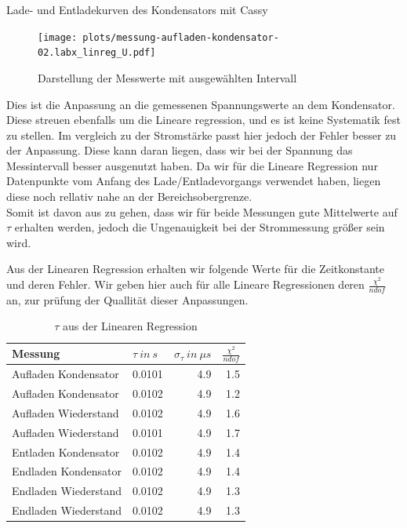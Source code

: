\documentclass[twoside]{protokoll}
\begin{document}
\begin{aufgabe}{Lade- und Entladekurven des Kondensators mit Cassy}
 
\begin{figure}[H]
    \centering
    \texttt{[image: plots/messung-aufladen-kondensator-02.labx\_linreg\_U.pdf]}
    \caption{Darstellung der Messwerte mit ausgewählten Intervall}
    \centering
\end{figure}
 
 Dies ist die Anpassung an die gemessenen Spannungswerte an dem Kondensator. Diese streuen ebenfalls um die Lineare regression, und es ist keine Systematik fest zu stellen. 
 Im vergleich zu der Stromstärke passt hier jedoch der Fehler besser zu der Anpassung. 
 Diese kann daran liegen, dass wir bei der Spannung das Messintervall besser ausgenutzt haben.
 Da wir für die Lineare Regression nur Datenpunkte vom Anfang des Lade/Entladevorgangs verwendet haben, liegen diese noch rellativ nahe an der Bereichsobergrenze.\\
 
 Somit ist davon aus zu gehen, dass wir für beide Messungen gute Mittelwerte auf $\tau$ erhalten werden, jedoch die Ungenauigkeit bei der Strommessung größer sein wird.

Aus der Linearen Regression erhalten wir folgende Werte für die Zeitkonstante und deren Fehler. Wir geben hier auch für alle Lineare Regressionen deren $\frac{\chi^2}{ndof}$ an, zur prüfung der Quallität dieser Anpassungen.

\begin{table}[H]
        \centering
        \begin{tabularx}{1\textwidth}{X X r r} %
            \toprule
            \textbf{Messung} & \textbf{$\tau \ in \ s$} & \textbf{$\sigma_{\tau} \ in \ \mu s$} & $\frac{\chi^2}{ndof}$ \\
            \midrule
            Aufladen Kondensator & 0.0101 & 4.9 & 1.5 \\
            Aufladen Kondensator & 0.0102 & 4.9 & 1.2 \\
            Aufladen Wiederstand & 0.0102 & 4.9 & 1.6 \\
            Aufladen Wiederstand & 0.0101 & 4.9 & 1.7 \\
            Entladen Kondensator & 0.0102 & 4.9 & 1.4 \\
            Endladen Kondensator & 0.0102 & 4.9 & 1.4 \\
            Endladen Wiederstand & 0.0102 & 4.9 & 1.3 \\
            Endladen Wiederstand & 0.0102 & 4.9 & 1.3 \\
            \bottomrule
        \end{tabularx}
        \caption{$\tau$ aus der Linearen Regression}
        \label{tab:mytable}
    \end{table}
    

\end{aufgabe}
\end{document}
